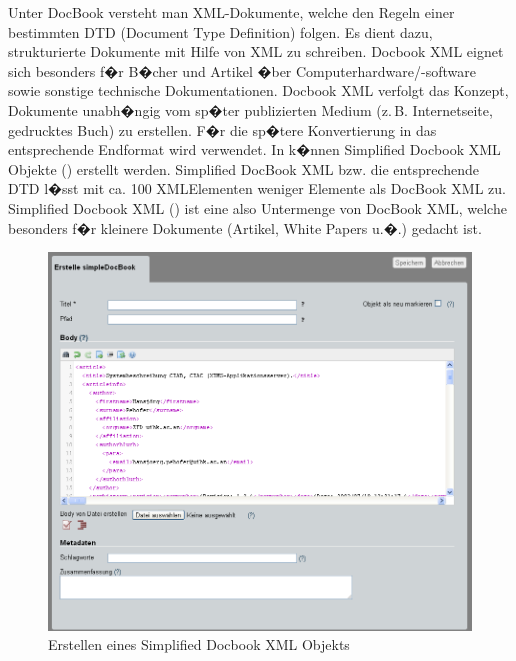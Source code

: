 Unter DocBook versteht man XML-Dokumente, welche den Regeln einer
bestimmten DTD (Document Type Definition) folgen. Es dient dazu,
strukturierte Dokumente mit Hilfe von XML zu schreiben. Docbook XML
eignet sich besonders f�r B�cher und Artikel �ber
Computerhardware/-software sowie sonstige technische Dokumentationen.
Docbook XML verfolgt das Konzept, Dokumente unabh�ngig vom sp�ter
publizierten Medium (z.\,B. Internetseite, gedrucktes Buch) zu
erstellen. F�r die sp�tere Konvertierung in das entsprechende
Endformat wird  verwendet. In  k�nnen Simplified Docbook XML
Objekte () erstellt werden. Simplified DocBook XML bzw. die
entsprechende DTD l�sst mit ca. 100 XMLElementen weniger Elemente als
DocBook XML zu. Simplified Docbook XML () ist eine also
Untermenge von DocBook XML, welche besonders f�r kleinere Dokumente
(Artikel, White Papers u.�.) gedacht ist.

\begin{figure}[!ht]
  \centering
  \includegraphics[width=\textwidth]{./images/create-sdocbookxml.png}
  \caption{Erstellen eines Simplified Docbook XML Objekts}
  \label{fig:erstelledocbookxml}
\end{figure}


